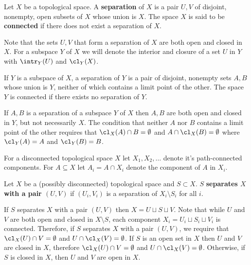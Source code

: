 
\begin{definition}
  Let $X$ be a topological space. A \textbf{separation} of $X$ is a pair $U, V$ of disjoint, nonempty, open subsets of $X$ whose union is $X$.
  The space $X$ is said to be \textbf{connected} if there does not exist a separation of $X$.
\end{definition}

Note that the sets $U, V$ that form a separation of $X$ are both open and closed in $X$.
For a subspace $Y$ of $X$ we will denote the interior and closure of a set $U$ in $Y$ with $\intr_Y(U)$ and $\cl_Y(X)$.

\begin{lemma}
  If $Y$ is a subspace of $X$, a separation of $Y$ is a pair of disjoint, nonempty sets $A, B$ whose union is $Y$, neither of which contains a limit point of the other.
  The space $Y$ is connected if there exists no separation of $Y$.
\end{lemma}

If $A, B$ is a separation of a subspace $Y$ of $X$ then $A, B$ are both open and closed in $Y$, but not necessarily $X$.
The condition that neither $A$ nor $B$ contains a limit point of the other requires that $\cl_X(A)\cap B = \emptyset$ and $A\cap \cl_X(B) =\emptyset$ where $\cl_Y(A) = A$ and $\cl_Y(B) = B$.


For a disconnected topological space $X$ let $X_1, X_2, \ldots$ denote it's path-connected components.
For $A\subseteq X$ let $A_i = A\cap X_i$ denote the component of $A$ in $X_i$.

\begin{definition}
  Let $X$ be a (possibly disconnected) topological space and $S\subset X$.
  $S$ \textbf{separates $X$ with a pair $(U, V)$} if $(U_i, V_i)$ is a separation of $X_i\setminus S_i$ for all $i$.
\end{definition}

If $S$ separates $X$ with a pair $(U, V)$ then $X = U\sqcup S\sqcup V$.
Note that while $U$ and $V$ are both open and closed in $X\setminus S$, each component $X_i = U_i\sqcup S_i\sqcup V_i$ is connected.
Therefore, if $S$ separates $X$ with a pair $(U, V)$, we require that $\cl_X(U)\cap V = \emptyset$ and $U\cap \cl_X(V) = \emptyset$.
If $S$ is an open set in $X$ then $U$ and $V$ are closed in $X$, therefore $\cl_X(U)\cap V = \emptyset$ and $U\cap \cl_X(V) = \emptyset$.
Otherwise, if $S$ is closed in $X$, then $U$ and $V$ are open in $X$.

